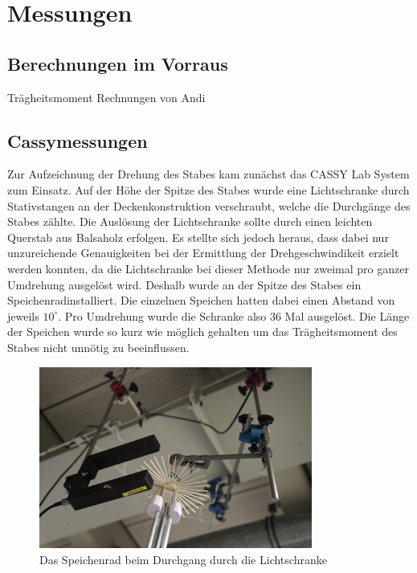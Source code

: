 \documentclass[11pt]{scrartcl}
\begin{document}
\section{Messungen}
\subsection{Berechnungen im Vorraus} %
Tr\"agheitsmoment Rechnungen von Andi

\subsection{Cassymessungen} %
Zur Aufzeichnung der Drehung des Stabes kam zun\"achst das CASSY Lab System zum Einsatz. Auf der H\"ohe der Spitze des Stabes wurde eine Lichtschranke durch Stativstangen an der Deckenkonstruktion verschraubt, welche die Durchg\"ange des Stabes z\"ahlte. Die Ausl\"osung der Lichtschranke sollte durch einen leichten Querstab aus Balsaholz erfolgen. Es stellte sich jedoch heraus, dass dabei nur unzureichende Genauigkeiten bei der Ermittlung der Drehgeschwindikeit erzielt werden konnten, da die Lichtschranke bei dieser Methode nur zweimal pro ganzer Umdrehung ausgel\"ost wird. Deshalb wurde an der Spitze des Stabes ein \glqq Speichenrad\grqq installiert. Die einzelnen Speichen hatten dabei einen Abstand von jeweils $10^\circ$. Pro Umdrehung wurde die Schranke also 36 Mal ausgel\"ost. Die L\"ange der Speichen wurde so kurz wie m\"oglich gehalten um das Tr\"agheitsmoment des Stabes nicht unn\"otig zu beeinflussen.

\begin{figure}[h]
\begin{center}
\includegraphics[width=0.8\textwidth]{images/lichtschranke.jpg}
\end{center}
\vspace{-1.5\baselineskip}
\caption{Das Speichenrad beim Durchgang durch die Lichtschranke}
\label{lichtschranke}
\end{figure}
\end{document}
